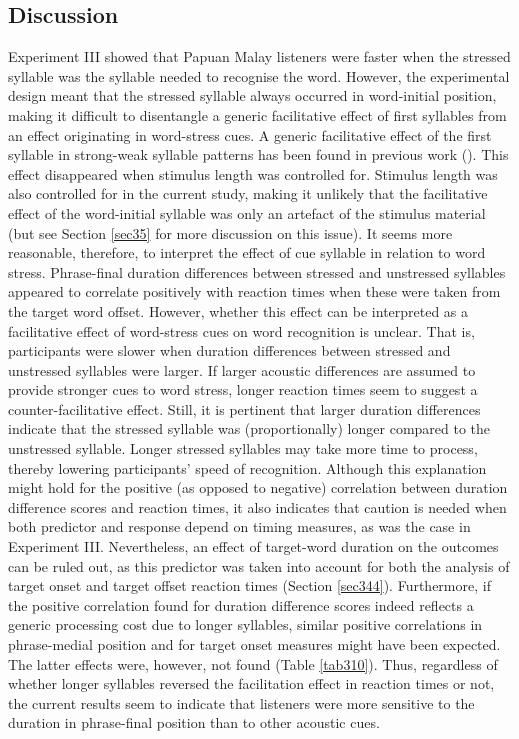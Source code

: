 \subsection{Discussion} \label{sec346}
Experiment III showed that Papuan Malay listeners were faster when the stressed syllable was the syllable needed to recognise the word. However, the experimental design meant that the stressed syllable always occurred in word-initial position, making it difficult to disentangle a generic facilitative effect of first syllables from an effect originating in word-stress cues. A generic facilitative effect of the first syllable in strong-weak syllable patterns has been found in previous work (\citealt{cutler_use_1984}). This effect disappeared when stimulus length was controlled for. Stimulus length was also controlled for in the current study, making it unlikely that the facilitative effect of the word-initial syllable was only an artefact of the stimulus material (but see Section \ref{sec35} for more discussion on this issue). It seems more reasonable, therefore, to interpret the effect of cue syllable in relation to word stress. Phrase-final duration differences between stressed and unstressed syllables appeared to correlate positively with reaction times when these were taken from the target word offset. However, whether this effect can be interpreted as a facilitative effect of word-stress cues on word recognition is unclear. That is, participants were slower when duration differences between stressed and unstressed syllables were larger. If larger acoustic differences are assumed to provide stronger cues to word stress, longer reaction times seem to suggest a counter-facilitative effect. Still, it is pertinent that larger duration differences indicate that the stressed syllable was (proportionally) longer compared to the unstressed syllable. Longer stressed syllables may take more time to process, thereby lowering participants' speed of recognition. Although this explanation might hold for the positive (as opposed to negative) correlation between duration difference scores and reaction times, it also indicates that caution is needed when both predictor and response depend on timing measures, as was the case in Experiment III. Nevertheless, an effect of target-word duration on the outcomes can be ruled out, as this predictor was taken into account for both the analysis of target onset and target offset reaction times (Section \ref{sec344}). Furthermore, if the positive correlation found for duration difference scores indeed reflects a generic processing cost due to longer syllables, similar positive correlations in phrase-medial position and for target onset measures might have been expected. The latter effects were, however, not found (Table \ref{tab310}). Thus, regardless of whether longer syllables reversed the facilitation effect in reaction times or not, the current results seem to indicate that listeners were more sensitive to the duration in phrase-final position than to other acoustic cues.

